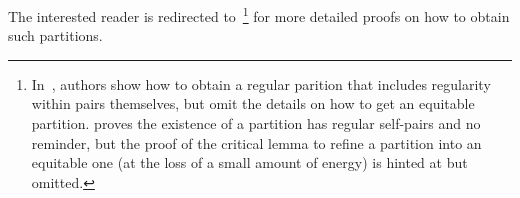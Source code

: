         The interested reader is redirected
        to~\cite{graph_removal_lemmas, graph_theory_and_additive_combinatorics_exploring_structure_and_randomness}\footnote{
            In~\cite{graph_theory_and_additive_combinatorics_exploring_structure_and_randomness}, authors show how to
            obtain a regular parition that includes regularity within pairs themselves, but omit the details on how to get
            an equitable partition.
            \cite{graph_removal_lemmas} proves the existence of a partition has regular self-pairs and no reminder, but
            the proof of the critical lemma to refine a partition into an equitable one (at the loss of a small amount
            of energy) is hinted at but omitted.}
        for more detailed proofs on how to obtain such partitions.
